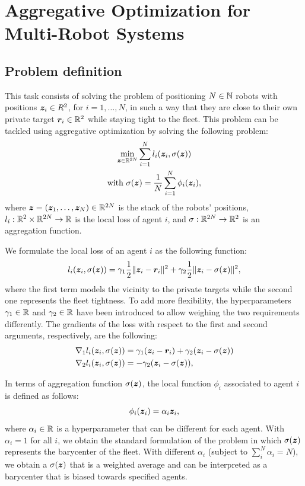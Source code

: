 \documentclass[a4paper,11pt,oneside]{book}
\begin{document}
\chapter{Aggregative Optimization for Multi-Robot Systems} \label{ch:aggregative}



\section{Problem definition}

This task consists of solving the problem of positioning $N \in {\mathbb{N}}$ robots with positions ${\bm{z}}_i \in R^2$, for $i=1, \dots, N$, in such a way that they are close to their own private target ${\bm{r}}_i \in {\mathbb{R}}^2$ while staying tight to the fleet. This problem can be tackled using aggregative optimization by solving the following problem:
\[
      \begin{gathered}
            \min_{{\bm{z}} \in {\mathbb{R}}^{2N}} \sum_{i=1}^{N} l_i({\bm{z}}_i, \sigma({\bm{z}})) \\
            \text{with } \sigma({\bm{z}}) = \frac{1}{N} \sum_{i=1}^{N} \phi_i({\bm{z}}_i),
      \end{gathered}
\]
where ${\bm{z}}=({\bm{z}}_1, \dots, {\bm{z}}_N) \in {\mathbb{R}}^{2N}$ is the stack of the robots' positions, $l_i: {\mathbb{R}}^{2} \times {\mathbb{R}}^{2N} \rightarrow {\mathbb{R}}$ is the local loss of agent $i$, and $\sigma: {\mathbb{R}}^{2N} \rightarrow {\mathbb{R}}^2$ is an aggregation function.

We formulate the local loss of an agent $i$ as the following function:
\[
      l_i({\bm{z}}_i, \sigma({\bm{z}})) = \gamma_1 \frac{1}{2} \Vert {\bm{z}}_i - {\bm{r}}_i \Vert^2 + \gamma_2 \frac{1}{2} \Vert {\bm{z}}_i - \sigma({\bm{z}}) \Vert^2,
\]
where the first term models the vicinity to the private targets while the second one represents the fleet tightness. To add more flexibility, the hyperparameters $\gamma_1 \in {\mathbb{R}}$ and $\gamma_2 \in {\mathbb{R}}$ have been introduced to allow weighing the two requirements differently. The gradients of the loss with respect to the first and second arguments, respectively, are the following:
\[
      \begin{split}
            \nabla_1 l_i({\bm{z}}_i, \sigma({\bm{z}})) &= \gamma_1 ({\bm{z}}_i - {\bm{r}}_i) + \gamma_2 ({\bm{z}}_i - \sigma({\bm{z}})) \\
            \nabla_2 l_i({\bm{z}}_i, \sigma({\bm{z}})) &= -\gamma_2 ({\bm{z}}_i - \sigma({\bm{z}})),
      \end{split}
\]

In terms of aggregation function $\sigma({\bm{z}})$, the local function $\phi_i$ associated to agent $i$ is defined as follows:
\[
      \phi_i({\bm{z}}_i) = \alpha_i {\bm{z}}_i,
\]
where $\alpha_i \in {\mathbb{R}}$ is a hyperparameter that can be different for each agent. With $\alpha_i = 1$ for all $i$, we obtain the standard formulation of the problem in which $\sigma({\bm{z}})$ represents the barycenter of the fleet. With different $\alpha_i$ (subject to $\sum_i^N \alpha_i = N$), we obtain a $\sigma({\bm{z}})$ that is a weighted average and can be interpreted as a barycenter that is biased towards specified agents.
\end{document}
